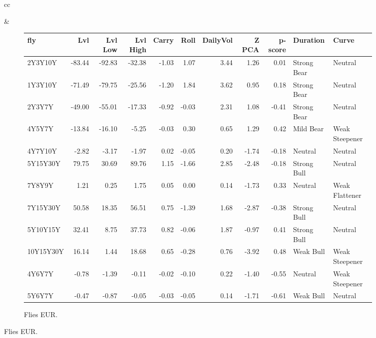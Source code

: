 \documentclass[a4paper,twoside]{report}
\begin{document}
\begin{figure}[htbp]
\begin{tabular}[c]{cc}
 
\begin{subfigure}[c]{0.5\textwidth}
 
 \end{subfigure}&
 
 \begin{subfigure}[c]{0.5\textwidth}
 \caption{Flies EUR.}
 \label{fig:Flies EUR}
 \begin{adjustbox}{max width=\textwidth}
 \begin{tabular}{lrrrrrrrrll}
\hline
       fly &    Lvl &  Lvl Low &  Lvl High &  Carry &  Roll &  DailyVol &  Z PCA &  p-score &     Duration &           Curve \\
\hline
   2Y3Y10Y & -83.44 &   -92.83 &    -32.38 &  -1.03 &  1.07 &      3.44 &   1.26 &     0.01 &  Strong Bear &         Neutral \\
   1Y3Y10Y & -71.49 &   -79.75 &    -25.56 &  -1.20 &  1.84 &      3.62 &   0.95 &     0.18 &  Strong Bear &         Neutral \\
    2Y3Y7Y & -49.00 &   -55.01 &    -17.33 &  -0.92 & -0.03 &      2.31 &   1.08 &    -0.41 &  Strong Bear &         Neutral \\
    4Y5Y7Y & -13.84 &   -16.10 &     -5.25 &  -0.03 &  0.30 &      0.65 &   1.29 &     0.42 &    Mild Bear &  Weak Steepener \\
   4Y7Y10Y &  -2.82 &    -3.17 &     -1.97 &   0.02 & -0.05 &      0.20 &  -1.74 &    -0.18 &      Neutral &         Neutral \\
  5Y15Y30Y &  79.75 &    30.69 &     89.76 &   1.15 & -1.66 &      2.85 &  -2.48 &    -0.18 &  Strong Bull &         Neutral \\
    7Y8Y9Y &   1.21 &     0.25 &      1.75 &   0.05 &  0.00 &      0.14 &  -1.73 &     0.33 &      Neutral &  Weak Flattener \\
  7Y15Y30Y &  50.58 &    18.35 &     56.51 &   0.75 & -1.39 &      1.68 &  -2.87 &    -0.38 &  Strong Bull &         Neutral \\
  5Y10Y15Y &  32.41 &     8.75 &     37.73 &   0.82 & -0.06 &      1.87 &  -0.97 &     0.41 &  Strong Bull &         Neutral \\
 10Y15Y30Y &  16.14 &     1.44 &     18.68 &   0.65 & -0.28 &      0.76 &  -3.92 &     0.48 &    Weak Bull &  Weak Steepener \\
    4Y6Y7Y &  -0.78 &    -1.39 &     -0.11 &  -0.02 & -0.10 &      0.22 &  -1.40 &    -0.55 &      Neutral &  Weak Steepener \\
    5Y6Y7Y &  -0.47 &    -0.87 &     -0.05 &  -0.03 & -0.05 &      0.14 &  -1.71 &    -0.61 &    Weak Bull &         Neutral \\

\end{tabular}
\end{adjustbox}
\end{subfigure}
\end{tabular}
\end{figure}
\end{document}
